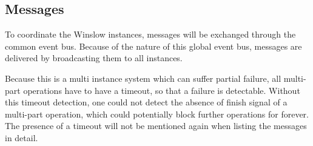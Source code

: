 \subsection{Messages}

To coordinate the Winslow instances, messages will be exchanged through the common event bus.
Because of the nature of this global event bus, messages are delivered by broadcasting them to all instances.

Because this is a multi instance system which can suffer partial failure, all multi-part operations have to have a timeout, so that a failure is detectable.
Without this timeout detection, one could not detect the absence of finish signal of a multi-part operation, which could potentially block further operations for forever.
The presence of a timeout will not be mentioned again when listing the messages in detail.

